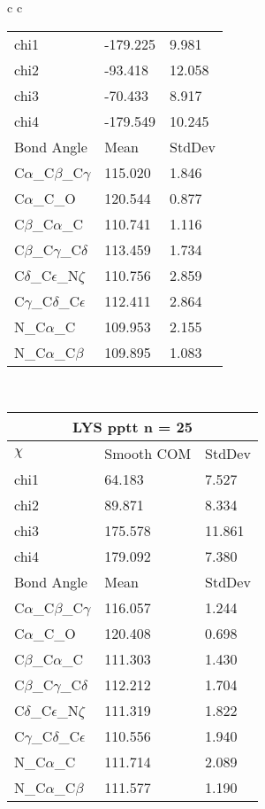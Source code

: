\begin{longtable}{ c c }
\begin{tabular}{ l l l }
  chi1 & -179.225 & 9.981 \\ 
  chi2 & -93.418 & 12.058 \\ 
  chi3 & -70.433 & 8.917 \\ 
  chi4 & -179.549 & 10.245 \\ \midrule
  Bond Angle   & Mean     & StdDev \\ \midrule
  C$\alpha$\_C$\beta$\_C$\gamma$ & 115.020 & 1.846\\
  C$\alpha$\_C\_O & 120.544 & 0.877\\
  C$\beta$\_C$\alpha$\_C & 110.741 & 1.116\\
  C$\beta$\_C$\gamma$\_C$\delta$ & 113.459 & 1.734\\
  C$\delta$\_C$\epsilon$\_N$\zeta$ & 110.756 & 2.859\\
  C$\gamma$\_C$\delta$\_C$\epsilon$ & 112.411 & 2.864\\
  N\_C$\alpha$\_C & 109.953 & 2.155\\
  N\_C$\alpha$\_C$\beta$ & 109.895 & 1.083\\
  \bottomrule
  \end{tabular}
  \\
  \begin{tabular}{ l l l }
  \toprule
  \multicolumn{3}{c}{LYS \textbf{pptt} n = 25} \\ \toprule
  $\chi$       & Smooth COM & StdDev \\ \midrule
  chi1 & 64.183 & 7.527 \\ 
  chi2 & 89.871 & 8.334 \\ 
  chi3 & 175.578 & 11.861 \\ 
  chi4 & 179.092 & 7.380 \\ \midrule
  Bond Angle   & Mean     & StdDev \\ \midrule
  C$\alpha$\_C$\beta$\_C$\gamma$ & 116.057 & 1.244\\
  C$\alpha$\_C\_O & 120.408 & 0.698\\
  C$\beta$\_C$\alpha$\_C & 111.303 & 1.430\\
  C$\beta$\_C$\gamma$\_C$\delta$ & 112.212 & 1.704\\
  C$\delta$\_C$\epsilon$\_N$\zeta$ & 111.319 & 1.822\\
  C$\gamma$\_C$\delta$\_C$\epsilon$ & 110.556 & 1.940\\
  N\_C$\alpha$\_C & 111.714 & 2.089\\
  N\_C$\alpha$\_C$\beta$ & 111.577 & 1.190\\
  \bottomrule
  \end{tabular}

\end{longtable}

